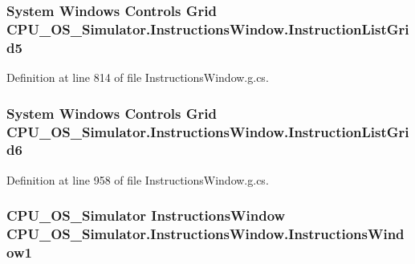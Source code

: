 \subsubsection[{Instruction\+List\+Grid5}]{\setlength{\rightskip}{0pt plus 5cm}System Windows Controls Grid C\+P\+U\+\_\+\+O\+S\+\_\+\+Simulator.\+Instructions\+Window.\+Instruction\+List\+Grid5\hspace{0.3cm}{\ttfamily [package]}}\label{class_c_p_u___o_s___simulator_1_1_instructions_window_a335e8ec02a78ffc483900745de96b602}


Definition at line 814 of file Instructions\+Window.\+g.\+cs.

\hypertarget{class_c_p_u___o_s___simulator_1_1_instructions_window_a6c86a044f242ee64f312f0105bac6d36}{}
\subsubsection[{Instruction\+List\+Grid6}]{\setlength{\rightskip}{0pt plus 5cm}System Windows Controls Grid C\+P\+U\+\_\+\+O\+S\+\_\+\+Simulator.\+Instructions\+Window.\+Instruction\+List\+Grid6\hspace{0.3cm}{\ttfamily [package]}}\label{class_c_p_u___o_s___simulator_1_1_instructions_window_a6c86a044f242ee64f312f0105bac6d36}


Definition at line 958 of file Instructions\+Window.\+g.\+cs.

\hypertarget{class_c_p_u___o_s___simulator_1_1_instructions_window_ab7cd84f5ba064256327f6b1b1cdbc525}{}
\subsubsection[{Instructions\+Window1}]{\setlength{\rightskip}{0pt plus 5cm}C\+P\+U\+\_\+\+O\+S\+\_\+\+Simulator {\bf Instructions\+Window} C\+P\+U\+\_\+\+O\+S\+\_\+\+Simulator.\+Instructions\+Window.\+Instructions\+Window1\hspace{0.3cm}{\ttfamily [package]}}\label{class_c_p_u___o_s___simulator_1_1_instructions_window_ab7cd84f5ba064256327f6b1b1cdbc525}


